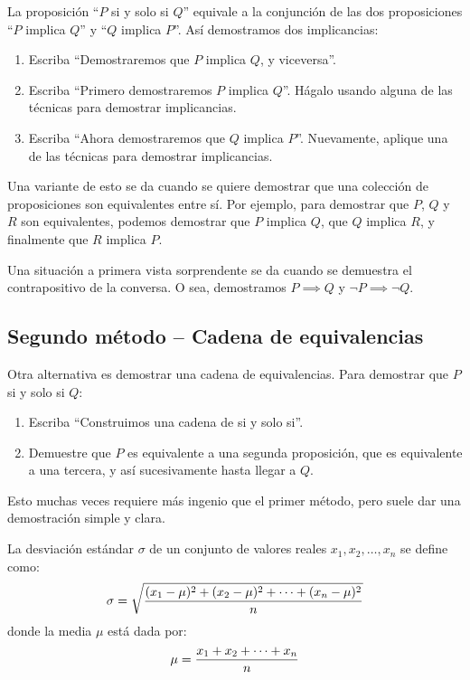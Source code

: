   La proposición ``\(P\) si y solo si \(Q\)''
  equivale a la conjunción de las dos proposiciones
  ``\(P\) implica \(Q\)''
  y ``\(Q\) implica \(P\)''.
  Así demostramos dos implicancias:
  \begin{enumerate}
  \item
    Escriba ``Demostraremos que \(P\) implica \(Q\), y viceversa''.
  \item
    Escriba ``Primero demostraremos \(P\) implica \(Q\)''.
    Hágalo usando alguna de las técnicas
    para demostrar implicancias.
  \item
    Escriba ``Ahora demostraremos que \(Q\) implica \(P\)''.
    Nuevamente,
    aplique una de las técnicas para demostrar implicancias.
  \end{enumerate}

  Una variante de esto se da
  cuando se quiere demostrar
  que una colección de proposiciones son equivalentes entre sí.
  Por ejemplo,
  para demostrar que \(P\), \(Q\) y \(R\) son equivalentes,
  podemos demostrar que \(P\) implica \(Q\),
  que \(Q\) implica \(R\),
  y finalmente que \(R\) implica \(P\).

  Una situación a primera vista sorprendente
  se da cuando se demuestra el contrapositivo de la conversa.
  O sea,
  demostramos \(P \implies Q\)
  y \(\neg P \implies \neg Q\).

\subsection{Segundo método -- Cadena de equivalencias}
\label{sec:equivalencias-2}

  Otra alternativa es demostrar una cadena de equivalencias.
  Para demostrar que \(P\) si y solo si \(Q\):
  \begin{enumerate}
  \item
    Escriba ``Construimos una cadena de si y solo si''.
  \item
    Demuestre que \(P\) es equivalente a una segunda proposición,
    que es equivalente a una tercera,
    y así sucesivamente hasta llegar a \(Q\).
  \end{enumerate}
  Esto muchas veces requiere más ingenio que el primer método,
  pero suele dar una demostración simple y clara.

  La desviación estándar \(\sigma\) de un conjunto de valores reales
  \(x_1, x_2, \dotsc, x_n\) se define como:
  \begin{equation}
    \label{eq:def-sigma}
    \index{desviacion estandar@desviación estándar|textbfhy}
    \sigma =
      \sqrt{\frac{(x_1 - \mu)^2
		    + (x_2 - \mu)^2
		    + \dotsb
		    + (x_n - \mu)^2}
		 {n}}
  \end{equation}
  donde la media \(\mu\) está dada por:
  \begin{equation}
    \label{eq:def-mu}
    \index{media|textbfhy}
    \mu = \frac{x_1 + x_2 + \dotsb + x_n}{n}
  \end{equation}

